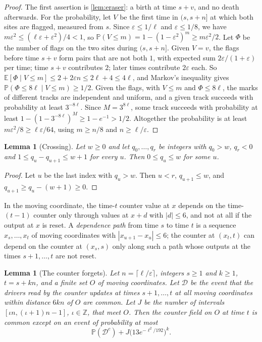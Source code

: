 \documentclass[11pt]{article}
\theoremstyle{plain}
\newtheorem{lemma}[theorem]{Lemma}
\theoremstyle{definition}
\theoremstyle{remark}
\newcommand{\Z}{\mathbb Z}
\newcommand{\Prob}{\mathbb P}
\newcommand{\Ex}{\mathbb E}
\newcommand{\eps}{\varepsilon}
\begin{document}
\begin{proof}
The first assertion is \cref{lem:eraser}: a birth at time $s+v$, and no death afterwards. For the probability, let $V$ be the first time in $(s,s+n]$ at which both sites are flagged, measured from $s$. Since $\eps\le1/\ell$ and $\eps\le1/8$, we have $m\eps^2\le(\ell\eps+\eps^2)/4<1$, so $\Prob(V\le m)=1-(1-\eps^2)^m\ge m\eps^2/2$. Let $\Phi$ be the number of flags on the two sites during $(s,s+n]$. Given $V=v$, the flags before time $s+v$ form pairs that are not both $1$, with expected sum $2\eps/(1+\eps)$ per time; time $s+v$ contributes $2$; later times contribute $2\eps$ each. So $\Ex[\Phi\mid V\le m]\le2+2\eps n\le2\ell+4\le4\ell$, and Markov's inequality gives $\Prob(\Phi\le8\ell\mid V\le m)\ge1/2$. Given the flags, with $V\le m$ and $\Phi\le8\ell$, the marks of different tracks are independent and uniform, and a given track succeeds with probability at least $3^{-8\ell}$. Since $M=3^{8\ell}$, some track succeeds with probability at least $1-(1-3^{-8\ell})^M\ge1-e^{-1}>1/2$. Altogether the probability is at least $m\eps^2/8\ge\ell\eps/64$, using $m\ge n/8$ and $n\ge\ell/\eps$.
\end{proof}

\begin{lemma}[Crossing]\label{lem:crossing}
Let $w\ge0$ and let $q_0,\dots,q_r$ be integers with $q_0>w$, $q_r<0$ and $1\le q_u-q_{u+1}\le w+1$ for every $u$. Then $0\le q_u\le w$ for some $u$.
\end{lemma}

\begin{proof}
Let $u$ be the last index with $q_u>w$. Then $u<r$, $q_{u+1}\le w$, and $q_{u+1}\ge q_u-(w+1)\ge0$.
\end{proof}

In the moving coordinate, the time-$t$ counter value at $x$ depends on the time-$(t-1)$ counter only through values at $x+d$ with $|d|\le6$, and not at all if the output at $x$ is reset. A \emph{dependence path} from time $s$ to time $t$ is a sequence $x_s,\dots,x_t$ of moving coordinates with $|x_{u+1}-x_u|\le6$; the counter at $(x_t,t)$ can depend on the counter at $(x_s,s)$ only along such a path whose outputs at the times $s+1,\dots,t$ are not reset.

\begin{lemma}[The counter forgets]\label{lem:counter-forgets}
Let $n=\lceil\ell/\eps\rceil$, integers $s\ge1$ and $k\ge1$, $t=s+kn$, and a finite set $O$ of moving coordinates. Let $\mathcal D$ be the event that the drivers read by the counter updates at times $s+1,\dots,t$ at all moving coordinates within distance $6kn$ of $O$ are common. Let $J$ be the number of intervals $[\iota n,(\iota+1)n-1]$, $\iota\in\Z$, that meet $O$. Then the counter field on $O$ at time $t$ is common except on an event of probability at most
\[
\Prob(\mathcal D^c)+J\bigl(13e^{-\ell^2/192}\bigr)^k .
\]
\end{lemma}
\end{document}
